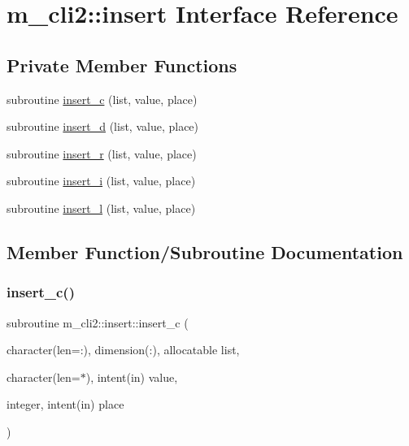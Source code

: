 \hypertarget{interfacem__cli2_1_1insert}{}\section{m\+\_\+cli2\+:\+:insert Interface Reference}
\label{interfacem__cli2_1_1insert}
\subsection*{Private Member Functions}
\begin{DoxyCompactItemize}
\item 
subroutine \mbox{\hyperlink{interfacem__cli2_1_1insert_af1a1ef419e4e9d4653fce92182e0e0c2}{insert\+\_\+c}} (list, value, place)
\item 
subroutine \mbox{\hyperlink{interfacem__cli2_1_1insert_afbcad9e7123fdec1b5c996adc6076a26}{insert\+\_\+d}} (list, value, place)
\item 
subroutine \mbox{\hyperlink{interfacem__cli2_1_1insert_a647342bf6669248878fd990a9d92ef2e}{insert\+\_\+r}} (list, value, place)
\item 
subroutine \mbox{\hyperlink{interfacem__cli2_1_1insert_a50fcaf89ea5907952b521845dd434835}{insert\+\_\+i}} (list, value, place)
\item 
subroutine \mbox{\hyperlink{interfacem__cli2_1_1insert_a48dedb7035fb157485c81de9fc245659}{insert\+\_\+l}} (list, value, place)
\end{DoxyCompactItemize}


\subsection{Member Function/\+Subroutine Documentation}
\mbox{\label{interfacem__cli2_1_1insert_af1a1ef419e4e9d4653fce92182e0e0c2}} 
\subsubsection{\texorpdfstring{insert\+\_\+c()}{insert\_c()}}
{\footnotesize\ttfamily subroutine m\+\_\+cli2\+::insert\+::insert\+\_\+c (\begin{DoxyParamCaption}\item[{character(len=\+:), dimension(\+:), allocatable}]{list,  }\item[{character(len=$\ast$), intent(in)}]{value,  }\item[{integer, intent(in)}]{place }\end{DoxyParamCaption})\hspace{0.3cm}{\ttfamily [private]}}

